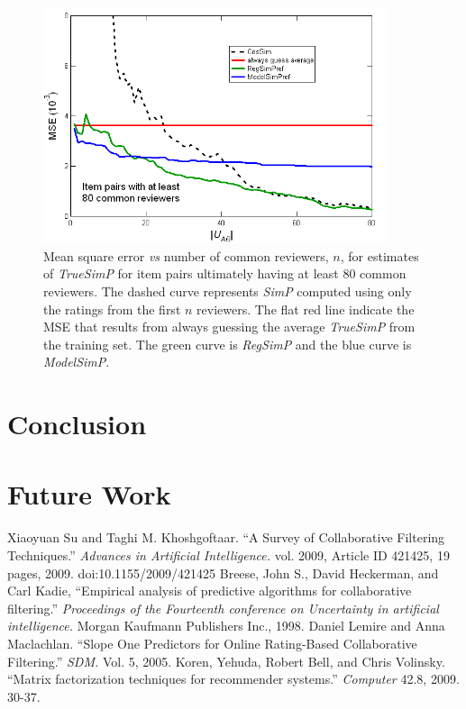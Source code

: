 \documentclass[11pt]{article}
\begin{document}
\begin{figure}[!htbp]
    \centering
    \includegraphics[width=0.9\textwidth]{MSE_SimP_80.png}
	\caption{Mean square error {\em vs} number of common reviewers, $n$, for
estimates of {\em TrueSimP} for item pairs ultimately having at least 80 common
reviewers. The dashed curve represents
{\em SimP} computed using only the ratings from the first $n$ reviewers. The
flat red line indicate the MSE that results from always guessing the average
{\em TrueSimP} from the training set. The green curve is {\em RegSimP} and the
blue curve is {\em ModelSimP}. }
    \label{fig:MSE_SimP}
\end{figure}

\section*{Conclusion}
\section*{Future Work}

\begin{thebibliography}{9}

    Xiaoyuan Su and Taghi M. Khoshgoftaar.
    ``A Survey of Collaborative Filtering Techniques.''
    \emph{Advances in Artificial Intelligence.} vol. 2009,
    Article ID 421425, 19 pages, 2009. doi:10.1155/2009/421425
    Breese, John S., David Heckerman, and Carl Kadie, 
    ``Empirical analysis of predictive algorithms for collaborative filtering.'' 
    \emph{Proceedings of the Fourteenth conference on Uncertainty in artificial intelligence.}
    Morgan Kaufmann Publishers Inc., 1998.
    Daniel Lemire and Anna Maclachlan.
    ``Slope One Predictors for Online Rating-Based Collaborative Filtering.''
    \emph{SDM.} Vol. 5, 2005.
    Koren, Yehuda, Robert Bell, and Chris Volinsky. 
    ``Matrix factorization techniques for recommender systems.''
    \emph{Computer} 42.8, 2009. 30-37.

\end{thebibliography}
\end{document}
